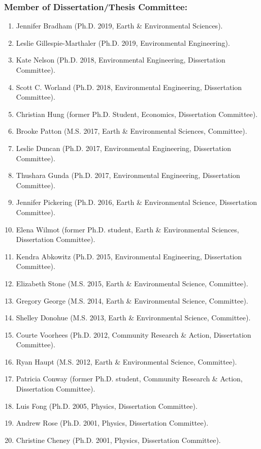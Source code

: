 \documentclass[10pt]{article}
\begin{document}
    \subsubsection{Member of Dissertation/Thesis Committee:}
    \begin{enumerate}
    \item Jennifer Bradham (Ph.D. 2019, Earth \& Environmental Sciences).
    \item Leslie Gillespie-Marthaler (Ph.D. 2019, Environmental Engineering).
    \item Kate Nelson (Ph.D. 2018, Environmental Engineering, Dissertation Committee).
    \item Scott C. Worland (Ph.D. 2018, Environmental Engineering, Dissertation Committee).
    \item Christian Hung (former Ph.D. Student, Economics, Dissertation Committee).
    \item Brooke Patton (M.S. 2017, Earth \& Environmental Sciences, Committee).
    \item Leslie Duncan (Ph.D. 2017, Environmental Engineering, Dissertation Committee).
    \item Thushara Gunda (Ph.D. 2017, Environmental Engineering, Dissertation Committee).
    \item Jennifer Pickering (Ph.D. 2016, Earth \& Environmental Science, Dissertation Committee).
    \item Elena Wilmot (former Ph.D. student, Earth \& Environmental Sciences, Dissertation Committee).
    \item Kendra Abkowitz (Ph.D. 2015, Environmental Engineering, Dissertation Committee).
    \item Elizabeth Stone (M.S. 2015, Earth \& Environmental Science, Committee).
    \item Gregory George (M.S. 2014, Earth \& Environmental Science, Committee).
    \item Shelley Donohue (M.S. 2013, Earth \& Environmental Science, Committee).
    \item Courte Voorhees (Ph.D. 2012,  Community Research \& Action, Dissertation Committee).
    \item Ryan Haupt (M.S. 2012, Earth \& Environmental Science, Committee).
    \item Patricia Conway (former Ph.D. student, Community Research \& Action, Dissertation Committee).
    \item Luis Fong (Ph.D. 2005, Physics, Dissertation Committee).
    \item Andrew Rose (Ph.D. 2001, Physics, Dissertation Committee).
    \item Christine Cheney (Ph.D. 2001, Physics, Dissertation Committee).
	\end{enumerate}
\end{document}

